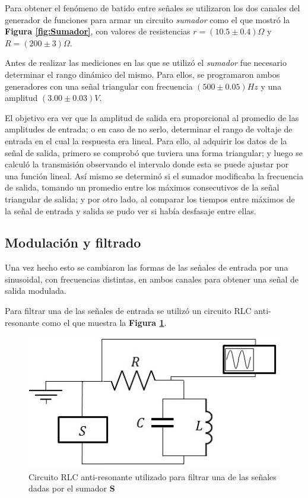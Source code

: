 \documentclass[11pt,a4paper]{article}
\begin{document}
Para obtener el fenómeno de batido entre señales se utilizaron los dos canales del generador de funciones para armar un circuito \textit{sumador} como el que mostró la \textbf{Figura \ref{fig:Sumador}}, con valores de resistencias $r=(10.5 \pm 0.4)\Omega$ y $R=(200 \pm 3)\Omega$.

Antes de realizar las mediciones en las que se utilizó el \textit{sumador} fue necesario determinar el rango dinámico del mismo. Para ellos, se programaron ambos generadores con una señal triangular con frecuencia $(500 \pm 0.05) Hz$ y una amplitud $(3.00 \pm 0.03)V$.

El objetivo era ver que la amplitud de salida era proporcional al promedio de las amplitudes de entrada; o en caso de no serlo, determinar el rango de voltaje de entrada en el cual la respuesta era lineal. Para ello, al adquirir los datos de la señal de salida, primero se comprobó que tuviera una forma triangular; y luego se calculó la transmisión observando el intervalo donde esta se puede ajustar por una función lineal. Así mismo se determinó si el sumador modificaba la frecuencia de salida, tomando un promedio entre los máximos consecutivos de la señal triangular de salida; y por otro lado, al comparar los tiempos entre máximos de la señal de entrada y salida se pudo ver si había desfasaje entre ellas. 

\subsection{Modulación y filtrado}
Una vez hecho esto se cambiaron las formas de las señales de entrada por una sinusoidal, con frecuencias distintas, en ambos canales para obtener una señal de salida modulada.

Para filtrar una de las señales de entrada se utilizó un circuito RLC anti-resonante como el que muestra la \textbf{Figura \ref{fig:filtro}}. 

\begin{figure}[h]
\centering
\includegraphics[scale=0.65]{filtro}
\caption{Circuito RLC anti-resonante utilizado para filtrar una de las señales dadas por el sumador \textbf{S}}
\label{fig:filtro}
\end{figure}
\end{document}
